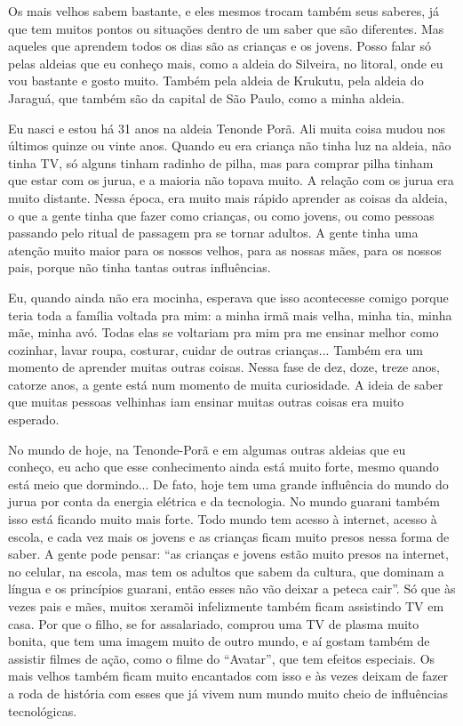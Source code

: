 \documentclass{article}
\begin{document}
Os mais velhos sabem bastante, e eles mesmos trocam tamb\'em seus
saberes, j\'a que tem muitos pontos ou situa\c{c}\~oes dentro de um
saber que s\~ao diferentes. Mas aqueles que aprendem todos os dias
s\~ao as crian\c{c}as e os jovens. Posso falar s\'o pelas aldeias que
eu conhe\c{c}o mais, como a aldeia do Silveira, no litoral, onde eu vou
bastante e gosto muito. Tamb\'em pela aldeia de Krukutu, pela aldeia do
Jaragu\'a, que tamb\'em s\~ao da capital de S\~ao Paulo, como a minha
aldeia.

Eu nasci e estou h\'a 31 anos na aldeia Tenonde Por\~a. Ali muita coisa
mudou nos \'ultimos quinze ou vinte anos. Quando eu era crian\c{c}a
n\~ao tinha luz na aldeia, n\~ao tinha TV, s\'o alguns tinham radinho
de pilha, mas para comprar pilha tinham que estar com os jurua, e a
maioria n\~ao topava muito. A rela\c{c}\~ao com os jurua era muito
distante. Nessa \'epoca, era muito mais r\'apido aprender as coisas da
aldeia, o que a gente tinha que fazer como crian\c{c}as, ou como
jovens, ou como pessoas passando pelo ritual de passagem pra se tornar
adultos. A gente tinha uma aten\c{c}\~ao muito maior para os nossos
velhos, para as nossas m\~aes, para os nossos pais, porque n\~ao tinha
tantas outras influ\^encias.

Eu, quando ainda n\~ao era mocinha, esperava que isso acontecesse comigo
porque teria toda a fam\'ilia voltada pra mim: a minha irm\~a mais
velha, minha tia, minha m\~ae, minha av\'o. Todas elas se voltariam pra
mim pra me ensinar melhor como cozinhar, lavar roupa, costurar, cuidar
de outras crian\c{c}as... Tamb\'em era um momento de aprender muitas
outras coisas. Nessa fase de dez, doze, treze anos, catorze anos, a
gente est\'a num momento de muita curiosidade. A ideia de saber que
muitas pessoas velhinhas iam ensinar muitas outras coisas era muito
esperado.

No mundo de hoje, na Tenonde-Por\~a e em algumas outras aldeias que eu
conhe\c{c}o, eu acho que esse conhecimento ainda est\'a muito forte,
mesmo quando est\'a meio que dormindo... De fato, hoje tem uma grande
influ\^encia do mundo do jurua por conta da energia el\'etrica e da
tecnologia. No mundo guarani tamb\'em isso est\'a ficando muito mais
forte. Todo mundo tem acesso \`a internet, acesso \`a escola, e cada
vez mais os jovens e as crian\c{c}as ficam muito presos nessa forma de
saber. A gente pode pensar: {\textquotedblleft}as crian\c{c}as e jovens
est\~ao muito presos na internet, no celular, na escola, mas tem os
adultos que sabem da cultura, que dominam a l\'ingua e os princ\'ipios
guarani, ent\~ao esses n\~ao v\~ao deixar a peteca
cair{\textquotedblright}. S\'o que \`as vezes pais e m\~aes, muitos
xeram\~oi infelizmente tamb\'em ficam assistindo TV em casa. Por que o
filho, se for assalariado, comprou uma TV de plasma muito bonita, que
tem uma imagem muito de outro mundo, e a\'i gostam tamb\'em de assistir
filmes de a\c{c}\~ao, como o filme do
{\textquotedblleft}Avatar{\textquotedblright}, que tem efeitos
especiais. Os mais velhos tamb\'em ficam muito encantados com isso e
\`as vezes deixam de fazer a roda de hist\'oria com esses que j\'a
vivem num mundo muito cheio de influ\^encias tecnol\'ogicas. 
\end{document}
